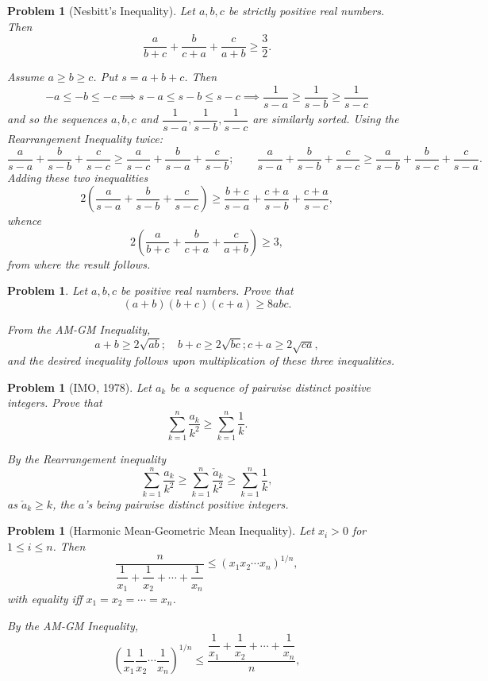 \documentclass[11pt, openany]{book}
\theoremstyle{change} \theoremheaderfont{\blue\sffamily\bfseries}
\newtheorem{pro}[thm]{Problem}
\theoremstyle{nonumberplain} \theoremheaderfont{\sffamily\bfseries}
\newcommand{\í}{\'{\i}}
\begin{document}
\begin{multicols}{2}
\begin{pro}[Nesbitt's Inequality] Let $a, b, c$ be strictly positive
real numbers. Then $$
\dfrac{a}{b+c}+\dfrac{b}{c+a}+\dfrac{c}{a+b}\geq \dfrac{3}{2}.
$$
\begin{answer}
Assume $a\geq b \geq c$. Put $s=a+b+c$. Then $$-a \leq -b \leq -c
\implies s-a\leq s-b\leq s-c\implies \dfrac{1}{s-a}\geq
\dfrac{1}{s-b}\geq \dfrac{1}{s-c}$$ and so the sequences $a, b, c$
and $\dfrac{1}{s-a},\dfrac{1}{s-b}, \dfrac{1}{s-c}$ are similarly
sorted. Using the Rearrangement Inequality twice: $$ \dfrac{a}{s-a}+
\dfrac{b}{s-b}+\dfrac{c}{s-c}\geq
\dfrac{a}{s-c}+\dfrac{b}{s-a}+\dfrac{c}{s-b}; \qquad \dfrac{a}{s-a}+
\dfrac{b}{s-b}+\dfrac{c}{s-c}\geq
\dfrac{a}{s-b}+\dfrac{b}{s-c}+\dfrac{c}{s-a}.
$$Adding these two inequalities
$$ 2\left( \dfrac{a}{s-a}+
\dfrac{b}{s-b}+\dfrac{c}{s-c}\right) \geq
\dfrac{b+c}{s-a}+\dfrac{c+a}{s-b}+\dfrac{c+a}{s-c},
$$whence
$$ 2\left( \dfrac{a}{b+c}+
\dfrac{b}{c+a}+\dfrac{c}{a+b}\right) \geq 3,
$$from where the result follows.
\end{answer}
\end{pro}
\begin{pro}
Let $a, b, c$ be positive real numbers. Prove that $$
(a+b)(b+c)(c+a)\geq 8abc.
$$
\begin{answer}
From the AM-GM Inequality, $$ a+b \geq 2\sqrt{ab}; \quad  b+c \geq
2\sqrt{bc}; c+a \geq 2\sqrt{ca}, $$and the desired inequality
follows upon multiplication of these three inequalities.
\end{answer}
\end{pro}
\begin{pro}[IMO, 1978]Let $a_k$ be a sequence of pairwise distinct
positive integers. Prove that $$\sum _{k=1} ^n \dfrac{a_k}{k^2}\geq
\sum _{k=1} ^n \dfrac{1}{k}.
$$
\begin{answer}
By the Rearrangement inequality
$$\sum _{k=1} ^n \dfrac{a_k}{k^2}\geq
\sum _{k=1} ^n \dfrac{\check{a}_k}{k^2}\geq \sum _{k=1} ^n
\dfrac{1}{k},
$$as $\check{a}_k \geq k$, the $a$'s being pairwise distinct
positive integers.
\end{answer}
\end{pro}
\begin{pro}[Harmonic
Mean-Geometric Mean Inequality] Let $x_i>0$ for $1 \leq i \leq n$.
Then
$$ \dfrac{n}{\dfrac{1}{x_1}+\dfrac{1}{x_2}+\cdots + \dfrac{1}{x_n}} \leq (x_1x_2\cdots x_n)^{1/n},  $$
with equality iff $x_1=x_2=\cdots =x_n$.
\begin{answer}By the AM-GM Inequality,
$$ \left(\dfrac{1}{x_1}\dfrac{1}{x_2}\cdots \dfrac{1}{x_n}\right)^{1/n}\leq \dfrac{\dfrac{1}{x_1}+\dfrac{1}{x_2}+\cdots + \dfrac{1}{x_n}}{n},  $$

\end{answer}
\end{pro}
\end{multicols}
\end{document}
